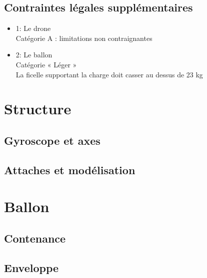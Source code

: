 \documentclass{beamer}
\begin{document}
\subsection{Contraintes légales supplémentaires}
\begin{frame}
  \begin{itemize}
    \item 1: Le drone \\
	    Catégorie A : limitations non contraignantes
    \item 2: Le ballon \\
	    Catégorie « Léger » \\
	    La ficelle supportant la charge doit casser au dessus de 23 kg
 \end{itemize}
\end{frame}


\section{Structure}

\subsection{Gyroscope et axes}
\subsection{Attaches et modélisation}

\section{Ballon}

\subsection{Contenance}
\subsection{Enveloppe}
\end{document}
